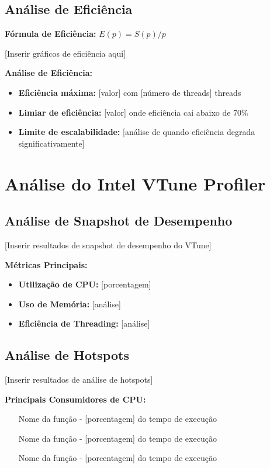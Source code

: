 \documentclass[a4paper,11pt]{article}
\begin{document}
\subsection{Análise de Eficiência}

\textbf{Fórmula de Eficiência:} $E(p) = S(p) / p$

[Inserir gráficos de eficiência aqui]

\textbf{Análise de Eficiência:}
\begin{itemize}
    \item \textbf{Eficiência máxima:} [valor] com [número de threads] threads
    \item \textbf{Limiar de eficiência:} [valor] onde eficiência cai abaixo de 70\%
    \item \textbf{Limite de escalabilidade:} [análise de quando eficiência degrada significativamente]
\end{itemize}

\section{Análise do Intel VTune Profiler}

\subsection{Análise de Snapshot de Desempenho}

[Inserir resultados de snapshot de desempenho do VTune]

\textbf{Métricas Principais:}
\begin{itemize}
    \item \textbf{Utilização de CPU:} [porcentagem]
    \item \textbf{Uso de Memória:} [análise]
    \item \textbf{Eficiência de Threading:} [análise]
\end{itemize}

\subsection{Análise de Hotspots}

[Inserir resultados de análise de hotspots]

\textbf{Principais Consumidores de CPU:}
\begin{enumerate}
    \item [Nome da função] - [porcentagem] do tempo de execução
    \item [Nome da função] - [porcentagem] do tempo de execução
    \item [Nome da função] - [porcentagem] do tempo de execução
\end{enumerate}
\end{document}
